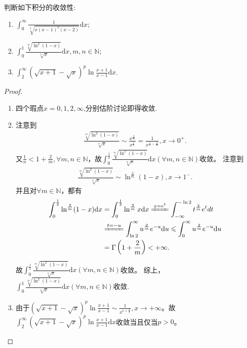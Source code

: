 \documentclass[../../main.tex]{subfiles}
\begin{document}
\begin{example}
判断如下积分的收敛性:
\begin{enumerate}
\item  \(\int_{0}^{\infty}\frac{1}{\sqrt[3]{x(x - 1)^2(x - 2)}}\mathrm{d}x\);

\item \(\int_{0}^{1}\frac{\sqrt[m]{\ln^2(1 - x)}}{\sqrt[n]{x}}\mathrm{d}x, m,n\in\mathbb{N}\);

\item \(\int_{2}^{\infty}(\sqrt{x + 1}-\sqrt{x})^p\ln\frac{x + 1}{x - 1}\mathrm{d}x\).
\end{enumerate}
\end{example}
\begin{proof}
\begin{enumerate}
\item 四个瑕点$x=0,1,2,\infty$,分别估阶讨论即得收敛.

\item 注意到
\begin{align*}
\frac{\sqrt[m]{\ln ^2(1 - x)}}{\sqrt[n]{x}}\sim\frac{x^{\frac{2}{m}}}{x^{\frac{1}{n}}}=\frac{1}{x^{\frac{1}{n}-\frac{2}{m}}},x\rightarrow 0^+.
\end{align*}
又\(\frac{1}{n}<1+\frac{2}{m},\forall m,n\in \mathbb{N}\)，故\(\int_{0}^{\frac{1}{2}}\frac{\sqrt[m]{\ln ^2(1 - x)}}{\sqrt[n]{x}}\mathrm{d}x\left( \forall m,n\in \mathbb{N} \right)\)收敛。
注意到
\begin{align*}
\frac{\sqrt[m]{\ln ^2(1 - x)}}{\sqrt[n]{x}}\sim\ln ^{\frac{2}{m}}(1 - x),x\rightarrow 1^-.
\end{align*}
并且对\(\forall m\in \mathbb{N}\)，都有
\begin{align*}
\int_0^{\frac{1}{2}}{\ln ^{\frac{2}{m}}(1}-x)\mathrm{d}x&=\int_0^{\frac{1}{2}}{\ln ^{\frac{2}{m}}x\mathrm{d}x\xlongequal{x=e^t}\int_{-\infty}^{-\ln 2}{t^{\frac{2}{m}}e^tdt}}
\\
&\xlongequal{t=-u}\int_{\ln 2}^{\infty}{u^{\frac{2}{m}}e^{-u}\mathrm{d}u}\leqslant \int_0^{\infty}{u^{\frac{2}{m}}e^{-u}\mathrm{d}u}
\\
&=\Gamma \left( 1+\frac{2}{m} \right) <+\infty .
\end{align*}
故\(\int_{0}^{\frac{1}{2}}\frac{\sqrt[m]{\ln ^2(1 - x)}}{\sqrt[n]{x}}\mathrm{d}x\left( \forall m,n\in \mathbb{N} \right)\)收敛。
综上，\(\int_{0}^{1}\frac{\sqrt[m]{\ln ^2(1 - x)}}{\sqrt[n]{x}}\mathrm{d}x\left( \forall m,n\in \mathbb{N} \right)\)收敛.

\item 由于\((\sqrt{x + 1} - \sqrt{x})^p\ln\frac{x + 1}{x - 1}\sim\frac{1}{x^{1+\frac{p}{2}}},x\rightarrow +\infty\)。故\(\int_{2}^{\infty}(\sqrt{x + 1} - \sqrt{x})^p\ln\frac{x + 1}{x - 1} \mathrm{d}x\)收敛当且仅当\(p > 0\)。 
\end{enumerate}
\end{proof}
\end{document}
